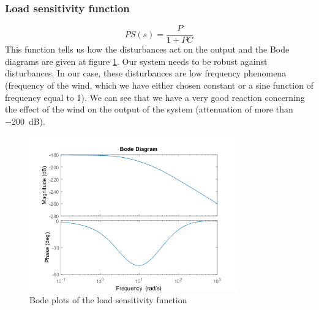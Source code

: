 \subsubsection{Load sensitivity function}
$$
PS(s) = \dfrac{P}{1 + PC}
$$
This function tells us how the disturbances act on the output and the Bode diagrams are given at figure \ref{fig:load}. Our system needs to be robust against disturbances. In our case, these disturbances are low frequency phenomena (frequency of the wind, which we have either chosen constant or a sine function of frequency equal to 1). We can see that we have a very good reaction concerning the effect of the wind on the output of the system (attenuation of more than \SI{-200}{\deci\bel}).
\begin{figure}[H]
    \centering
    \includegraphics[width=0.8\textwidth]{resources/png/load.png}
    \caption{Bode plots of the load sensitivity function}
    \label{fig:load}
\end{figure}

